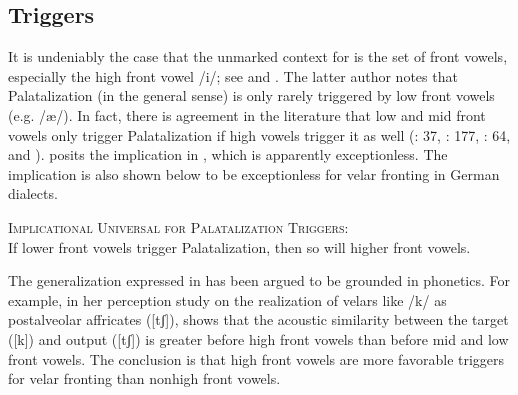 \begin{xlist}
\begin{xlist}
\subsection{Triggers}\label{sec:2.3.3}

It is undeniably the case that the unmarked context for  is the set of front vowels, especially the high front vowel /i/; see \citet[62]{Bateman2007} and \citet{Kochetov2011}. The latter author notes that Palatalization (in the general sense) is only rarely triggered by low front vowels (e.g. /æ/). In fact, there is agreement in the literature that low and mid front vowels only trigger Palatalization if high vowels trigger it as well (\citealt{Neeld1973}: 37, \citealt{Chen1973}: 177, \citealt{Bateman2007}: 64, and \citealt{Kochetov2011}). \citet[64]{Bateman2007} posits the implication in , which is apparently exceptionless. The implication is also shown below to be exceptionless for velar fronting in German dialects.

\eanoraggedright%
    \label{ex:2:21}
          \textsc{{Implicational} \textsc{Universal} \textsc{for} \textsc{Palatalization} \textsc{Triggers}}:\\
          If lower front vowels trigger Palatalization, then so will higher front vowels.
\z

The generalization expressed in  has been argued to be grounded in phonetics. For example, in her perception study on the realization of velars like /k/ as postalveolar affricates ([tʃ]), \citet{Guion1998} shows that the acoustic similarity between the target ([k]) and output ([tʃ]) is greater before high front vowels than before mid and low front vowels. The conclusion is that high front vowels are more favorable triggers for velar fronting than nonhigh front vowels.


\end{xlist}
\end{xlist}

